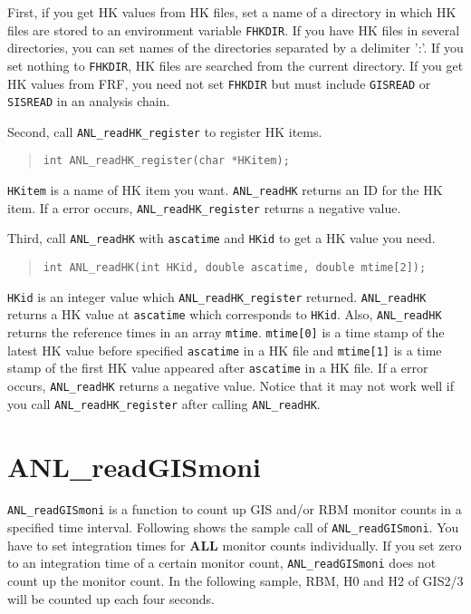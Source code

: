 First,
if you get HK values from HK files,
set a name of a directory in which HK files are stored
to an environment variable {\tt FHKDIR}.
If you have HK files in several directories,
you can set names of the directories separated by a delimiter ':'.
If you set nothing to {\tt FHKDIR},
HK files are searched from the current directory.
If you get HK values from FRF, you need not set {\tt FHKDIR}
but must include {\tt GISREAD} or {\tt SISREAD} in an analysis chain.

Second,
call {\tt ANL\_readHK\_register} to register HK items.
\begin{quote}\baselineskip 3.2mm\begin{verbatim}
int ANL_readHK_register(char *HKitem);
\end{verbatim}\end{quote}
{\tt HKitem} is a name of HK item you want.
{\tt ANL\_readHK} returns an ID for the HK item.
If a error occurs, {\tt ANL\_readHK\_register} returns a negative value. 

Third,
call {\tt ANL\_readHK} with {\tt ascatime} and {\tt HKid}
to get a HK value you need.
\begin{quote}\baselineskip 3.2mm\begin{verbatim}
int ANL_readHK(int HKid, double ascatime, double mtime[2]);
\end{verbatim}\end{quote}
{\tt HKid} is an integer value which {\tt ANL\_readHK\_register} returned.
{\tt ANL\_readHK} returns a HK value at {\tt ascatime}
which corresponds to {\tt HKid}.
Also,
{\tt ANL\_readHK} returns the reference times in an array {\tt mtime}.
{\tt mtime[0]} is a time stamp of the latest HK value
before specified {\tt ascatime} in a HK file
and {\tt mtime[1]} is a time stamp of the first HK value
appeared after {\tt ascatime} in a HK file.
If a error occurs, {\tt ANL\_readHK} returns a negative value.
Notice that it may not work well if you call {\tt ANL\_readHK\_register} after calling {\tt ANL\_readHK}.

\section{ANL\_readGISmoni}\label{sec:ANL_readGISmoni}
{\tt ANL\_readGISmoni} is a function to count up
GIS and/or RBM monitor counts in a specified time interval.
Following shows the sample call of {\tt ANL\_readGISmoni}.
You have to set integration times for {\bf ALL} monitor counts individually.
If you set zero to an integration time of a certain monitor count,
{\tt ANL\_readGISmoni} does not count up the monitor count.
In the following sample, 
RBM, H0 and H2 of GIS2/3 will be counted up each four seconds.

